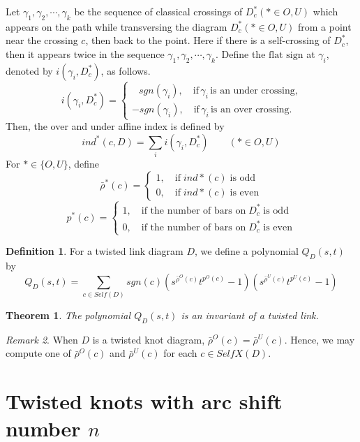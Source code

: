 \documentclass[10pt,a4paper,reqno]{amsart}
\newtheorem{theorem}{Theorem}[section]
\theoremstyle{definition}
\newtheorem{definition}{Definition}[section]
\theoremstyle{remark}
\newtheorem{remark}[theorem]{Remark}
\begin{document}
	Let $\gamma_1, \gamma_2, \cdots,\gamma_k$ be the sequence of classical crossings of $D_{c}^{*}  (*\in {O,U
	})$ which appears on the path while transversing the diagram $D_{c}^{*}  (*\in {O,U
	})$ from a point near the crossing $c$, then back to the point. Here if there is a self-crossing of $D_{c}^{*}$, then it appears twice in the sequence $\gamma_1, \gamma_2, \cdots,\gamma_k$.
	Define the $\text{flat sign}$ at $\gamma_i$, denoted by $i(\gamma_i, D_c^*)$, as follows.
	\[i(\gamma_i, D_c^*) = \begin{cases}
		
		\; \; \, sgn(\gamma_i), \quad \text{if} \, \gamma_i \, \text{is an under crossing,}\\
		-sgn(\gamma_i), \quad \text{if} \, \gamma_i \, \text{is an over crossing.}
		
	\end{cases}\]
	Then, the over and under affine index is defined by 
	\[ind^*(c,D) = \sum_i i(\gamma_i, D_c^*) \qquad (*\in {O,U
	})\]
	For $*\in \{O, U\}$, define \[  \bar{\rho}^*(c) = \begin{cases}
		1, \quad  \text{if} \; ind*(c)\; \text{is odd} \\
		0, \quad  \text{if} \; ind*(c)\; \text{is even}
	\end{cases}    \]
	\[  p^*(c) = \begin{cases}
		1, \quad  \text{if the number of bars on} \;  D^*_c \; \text{is odd} \\
		0, \quad  \text{if  the number of bars on}\; D^*_c \;  \text{is even}
	\end{cases}    \]
	\begin{definition}\cite{Naoko1}\label{def:Q}
		For a twisted link diagram $D$, we define a polynomial $Q_D(s,t)$ by 
		\[ Q_D(s,t) = \sum_{c \in Self(D)} sgn(c) (s^{\bar{\rho}^{O}(c)} t^{p^{O}(c)} -1) (s^{\bar{\rho}^{U}(c)} t^{p^{U}(c)} -1)\]
	\end{definition}
	\begin{theorem}\cite{Naoko1}
		The polynomial $Q_D(s,t)$ is an invariant of a twisted link.
	\end{theorem}
	\begin{remark}\cite{Naoko1}\label{rem:over}
		When $D$ is a twisted knot diagram, $\bar{\rho}^{O}(c) = \bar{\rho}^{U}(c)$. Hence, we may compute one of $\bar{\rho}^{O}(c)$ and $\bar{\rho}^{U}(c)$ for each $c\in SelfX(D)$.
		
	\end{remark}
	
	\section{Twisted knots with arc shift number $n$}\label{sec:fam}
	
\end{document}
